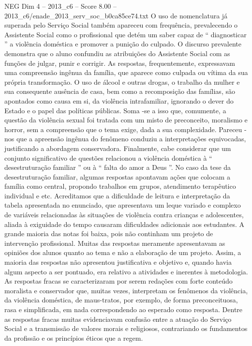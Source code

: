 \begin{textsample}{NEG Dim 4 – 2013\_c6 – Score 8.00 – 2013\_c6/enade\_2013\_serv\_soc\_b0ca85ce74.txt}
O uso de nomenclatura já superada pelo Serviço Social também apareceu com frequência, prevalecendo o Assistente Social como o profissional que detém um saber capaz de “ diagnosticar ” a violência doméstica e promover a punição do culpado.
O discurso prevalente demonstra que o aluno confundiu as atribuições do Assistente Social com as funções de julgar, punir e corrigir.
As respostas, frequentemente, expressavam uma compreensão ingênua da família, que aparece como culpada ou vítima da sua própria transformação.
O uso de álcool e outras drogas, o trabalho da mulher e sua consequente ausência de casa, bem como a recomposição das famílias, são apontados como causa em si, da violência intrafamiliar, ignorando o dever do Estado e o papel das políticas públicas.
Soma -se a isso que, comumente, a questão da violência sexual foi tratada com um misto de preconceito, moralismo e horror, sem a compreensão que o tema exige, dada a sua complexidade.
Pareceu -nos que a apreensão ingênua do fenômeno conduziu a interpretações equivocadas, justificando a abordagem conservadora.
Finalmente, cabe considerar que um conjunto significativo de questões relacionou a violência doméstica à “ desestruturação familiar ” ou à “ falta do amor a Deus ”.
No caso da tese da desestruturação familiar, algumas respostas apontavam ações que colocam a família como central, propondo trabalhos em grupos, atendimento terapêutico individual e etc.
Acreditamos que a dificuldade de leitura e interpretação da tabela apresentada no enunciado, que apresentava um leque variado e complexo de variáveis relacionadas às situações de violência contra crianças e adolescentes, aliada à exiguidade do tempo causaram dificuldades adicionais aos estudantes.
A grande maioria das notas foi baixa, pois não continham um projeto de intervenção profissional.
Muitas das respostas meramente apresentavam as opiniões dos alunos quanto ao tema e não a elaboração de um projeto.
Assim, a maioria das respostas não apresentou justificativa e objetivo e, quando havia algum aspecto a ser pontuado, era relativo a atividades e inerentes à metodologia.
As respostas fracas se caracterizaram por serem redações com forte conteúdo moralista e conservador que, muitas vezes, interpretam os fenômenos da violência, da violência doméstica, de maus-tratos, por exemplo, de forma preconceituosa, rasa e simplificada, em nada correspondendo ao esperado como resposta.
Dentre as respostas fracas muitas evidenciavam confusão entre a atuação do Serviço Social e a transmissão de valores morais e religiosos, contrariando os fundamentos da profissão e os princípios éticos que a regem.

\end{textsample}
